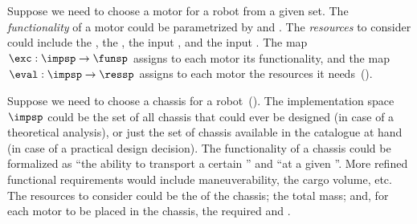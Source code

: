 \begin{example}
\label{exa:motor}Suppose we need to choose a motor for a robot from
a given set. The \emph{functionality} of a motor could be parametrized
by  and . The \emph{resources} to consider
could include the , the , the
input , and the input .
The map~$\exc:\impsp\rightarrow\funsp$ assigns to each motor its
functionality, and the map~$\eval:\impsp\rightarrow\ressp$ assigns
to each motor the resources it needs~().
\end{example}
\begin{example}
\label{exa:chassis}Suppose we need to choose a chassis for a robot~().
The implementation space~$\impsp$ could be the set of all chassis
that could ever be designed (in case of a theoretical analysis), or
just the set of chassis available in the catalogue at hand (in case
of a practical design decision). The functionality of a chassis could
be formalized as ``the ability to transport a certain '' and ``at a given ''. More refined
functional requirements would include maneuverability, the cargo volume,
etc. The resources to consider could be the  of
the chassis; the total mass; and, for each motor to be placed in the
chassis, the required  and .
\end{example}

